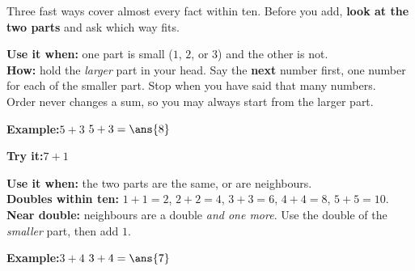 \documentclass[12pt]{article}
\begin{document}

\noindent\small Three fast ways cover almost every fact within ten. Before you
add, \textbf{look at the two parts} and ask which way fits.\normalsize


\begin{formulabox}
\textbf{Use it when:} one part is small ($1$, $2$, or $3$) and the other is not.\\[3pt]
\textbf{How:} hold the \emph{larger} part in your head. Say the \textbf{next}
number first, one number for each of the smaller part. Stop when you have said
that many numbers.\\[3pt]
Order never changes a sum, so you may always start from the larger part.
\end{formulabox}

\begin{examplebox}
\textbf{Example:}\quad $5 + 3$
$5 + 3 = \ans{8}$
\end{examplebox}

\begin{tryitbox}
\textbf{Try it:}\quad $7 + 1$\\[2pt]
\end{tryitbox}


\begin{formulabox}
\textbf{Use it when:} the two parts are the same, or are neighbours.\\[3pt]
\textbf{Doubles within ten:} $1{+}1{=}2$, \; $2{+}2{=}4$, \; $3{+}3{=}6$, \;
$4{+}4{=}8$, \; $5{+}5{=}10$.\\[3pt]
\textbf{Near double:} neighbours are a double \emph{and one more}. Use the
double of the \emph{smaller} part, then add $1$.
\end{formulabox}

\begin{examplebox}
\textbf{Example:}\quad $3 + 4$
$3 + 4 = \ans{7}$
\end{examplebox}
\end{document}
